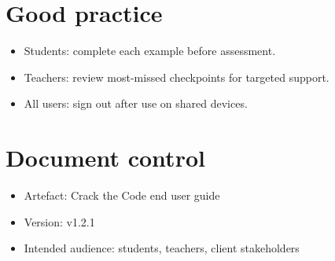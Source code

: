 \documentclass[11pt,a4paper]{article}
\begin{document}
\section{Good practice}
\begin{itemize}
  \item Students: complete each example before assessment.
  \item Teachers: review most-missed checkpoints for targeted support.
  \item All users: sign out after use on shared devices.
\end{itemize}

\section{Document control}
\begin{itemize}
  \item Artefact: Crack the Code end user guide
  \item Version: v1.2.1
  \item Intended audience: students, teachers, client stakeholders
\end{itemize}
\end{document}
